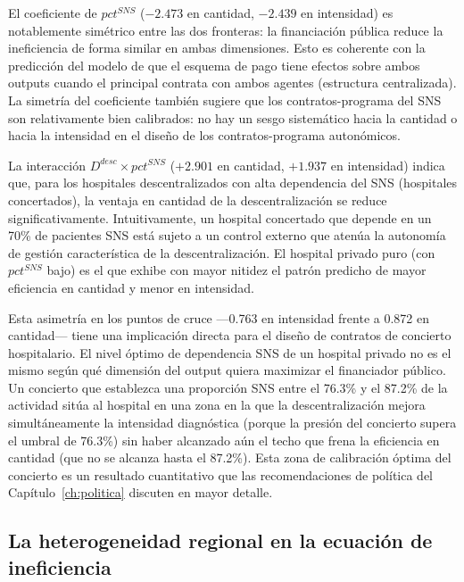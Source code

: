 El coeficiente de $pct^{SNS}$ ($-2.473$ en cantidad, $-2.439$ en intensidad) es notablemente simétrico entre las dos fronteras: la financiación pública reduce la ineficiencia de forma similar en ambas dimensiones. Esto es coherente con la predicción del modelo de que el esquema de pago tiene efectos sobre ambos outputs cuando el principal contrata con ambos agentes (estructura centralizada). La simetría del coeficiente también sugiere que los contratos-programa del SNS son relativamente bien calibrados: no hay un sesgo sistemático hacia la cantidad o hacia la intensidad en el diseño de los contratos-programa autonómicos.

La interacción $D^{desc}\times pct^{SNS}$ ($+2.901$ en cantidad, $+1.937$ en intensidad) indica que, para los hospitales descentralizados con alta dependencia del SNS (hospitales concertados), la ventaja en cantidad de la descentralización se reduce significativamente. Intuitivamente, un hospital concertado que depende en un 70\% de pacientes SNS está sujeto a un control externo que atenúa la autonomía de gestión característica de la descentralización. El hospital privado puro (con $pct^{SNS}$ bajo) es el que exhibe con mayor nitidez el patrón predicho de mayor eficiencia en cantidad y menor en intensidad.

Esta asimetría en los puntos de cruce ---0.763 en intensidad frente a 0.872 en cantidad--- tiene una implicación directa para el diseño de contratos de concierto hospitalario. El nivel óptimo de dependencia SNS de un hospital privado no es el mismo según qué dimensión del output quiera maximizar el financiador público. Un concierto que establezca una proporción SNS entre el 76.3\% y el 87.2\% de la actividad sitúa al hospital en una zona en la que la descentralización mejora simultáneamente la intensidad diagnóstica (porque la presión del concierto supera el umbral de 76.3\%) sin haber alcanzado aún el techo que frena la eficiencia en cantidad (que no se alcanza hasta el 87.2\%). Esta zona de calibración óptima del concierto es un resultado cuantitativo que las recomendaciones de política del Capítulo~\ref{ch:politica} discuten en mayor detalle.

\subsection{La heterogeneidad regional en la ecuación de ineficiencia}

